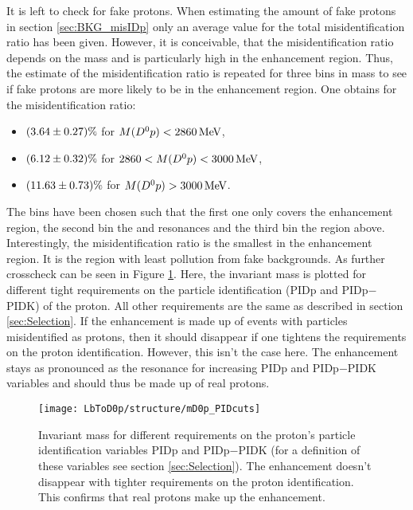 It is left to check for fake protons.
When estimating the amount of fake protons in section \ref{sec:BKG_misIDp} only an average value for the total misidentification ratio has been given.
However, it is conceivable, that the misidentification ratio depends on the \Dz\proton mass and is particularly high in the enhancement region.
Thus, the estimate of the misidentification ratio is repeated for three bins in \Dz\proton mass to see if fake protons are more likely to be in the enhancement region.
One obtains for the misidentification ratio:
\begin{itemize}
    \item $(3.64 \pm 0.27)\%$ for $M({{D}^0}{p}) < 2860 \mathrm{\,Me\kern -0.1em V}$,
    \item $(6.12 \pm 0.32)\%$ for $2860 < M({{D}^0}{p}) < 3000 \mathrm{\,Me\kern -0.1em V}$,
    \item $(11.63 \pm 0.73)\%$ for $M({{D}^0}{p}) > 3000 \mathrm{\,Me\kern -0.1em V}$.
\end{itemize}
The bins have been chosen such that the first one only covers the enhancement region, the second bin the \LcResI and \LcResII resonances and the third bin the region above.
Interestingly, the misidentification ratio is the smallest in the enhancement region.
It is the region with least pollution from fake backgrounds.
As further crosscheck can be seen in Figure \ref{fig:plot_mD0p_PIDcuts}. 
Here, the invariant \Dz\proton mass is plotted for different tight requirements on the particle identification (PIDp and PIDp$-$PIDK) of the proton.
All other requirements are the same as described in section \ref{sec:Selection}.
If the enhancement is made up of events with particles misidentified as protons, then it should disappear if one tightens the requirements on the proton identification.
However, this isn't the case here.
The enhancement stays as pronounced as the \LcResI resonance for increasing PIDp and PIDp$-$PIDK variables and should thus be made up of real protons.
\begin{figure}[hptb]
	\centering
	\texttt{[image: LbToD0p/structure/mD0p\_PIDcuts]}
	\caption{Invariant \Dz\proton mass for different requirements on the proton's particle identification variables PIDp and PIDp$-$PIDK (for a definition of these variables see section \ref{sec:Selection}). 
             The enhancement doesn't disappear with tighter requirements on the proton identification.
             This confirms that real protons make up the enhancement.
    }
	\label{fig:plot_mD0p_PIDcuts}
\end{figure}

